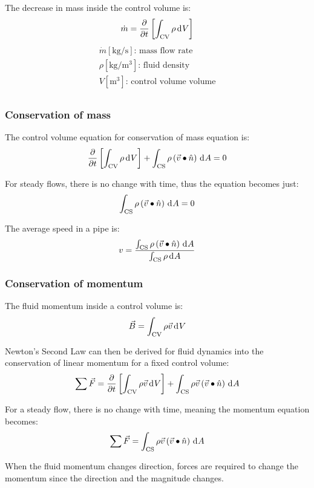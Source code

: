 \documentclass[10pt, twocolumn]{article}
\begin{document}
The decrease in mass inside the control volume is:
\[
  \dot{m} = \frac{\partial }{\partial t} \left[ \int_\mathrm{CV}{\rho \,\mathrm{d}^{} V} \right]
\]
\[
  \begin{array}{|l}
    \dot{m} [\si{\kilogram\per\second}] \text{: mass flow rate}  \\
    \rho [\si{\kilogram\per\metre\cubed}] \text{: fluid density} \\
    V [\si{\metre\cubed}] \text{: control volume volume}         \\
  \end{array}
\]


\subsubsection{Conservation of mass}
The control volume equation for conservation of mass equation is:
\[
  \frac{\partial }{\partial t} \left[ \int_\mathrm{CV}{\rho \,\mathrm{d}^{} V} \right] + \int_\mathrm{CS}{\rho \left( \vec{v} \bullet \hat{n} \right) \,\mathrm{d}^{} A} = 0
\]

For steady flows, there is no change with time, thus the equation becomes just:
\[
  \int_\mathrm{CS}{\rho \left( \vec{v} \bullet \hat{n} \right) \,\mathrm{d}^{} A} = 0
\]

The average speed in a pipe is:
\[
  v = \frac{\int_\mathrm{CS}{\rho \left( \vec{v} \bullet \hat{n} \right) \,\mathrm{d}^{} A}}{\int_\mathrm{CS}{\rho \,\mathrm{d}^{} A}}
\]

\subsubsection{Conservation of momentum}
The fluid momentum inside a control volume is:
\[
  \vec{B} = \int_\mathrm{CV}{\rho \vec{v} \,\mathrm{d}^{} V}
\]

Newton's Second Law can then be derived for fluid dynamics into the conservation of linear momentum for a fixed control volume:
\[
  \sum{\vec{F}} = \frac{\partial }{\partial t} \left[ \int_\mathrm{CV}{\rho \vec{v} \,\mathrm{d}^{} V} \right] + \int_\mathrm{CS}{\rho \vec{v} \left( \vec{v} \bullet \hat{n} \right) \,\mathrm{d}^{} A}
\]

For a steady flow, there is no change with time, meaning the momentum equation becomes:
\[
  \sum{\vec{F}} = \int_\mathrm{CS}{\rho \vec{v} \left( \vec{v} \bullet \hat{n} \right) \,\mathrm{d}^{} A}
\]

\begin{remark}
  When the fluid momentum changes direction, forces are required to change the momentum since the direction and the magnitude changes.
\end{remark}
\end{document}
